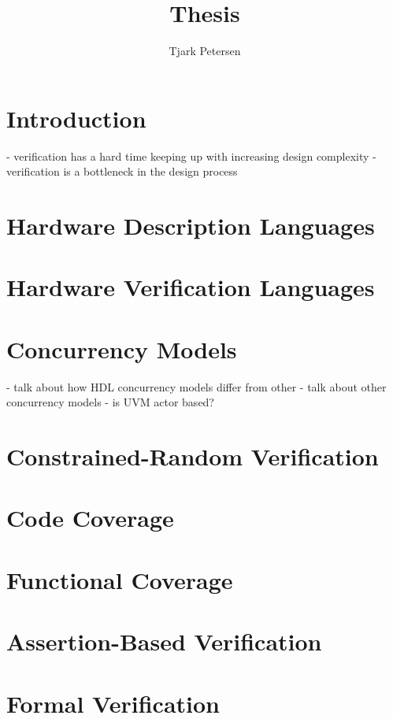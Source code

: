 \documentclass[11pt]{article}
\author{Tjark Petersen}
\title{Thesis}
\begin{document}
\maketitle

\section{Introduction}

- verification has a hard time keeping up with increasing design complexity
- verification is a bottleneck in the design process

\section{Hardware Description Languages}

\section{Hardware Verification Languages}

\section{Concurrency Models}
- talk about how HDL concurrency models differ from other
- talk about other concurrency models
- is UVM actor based?

\section{Constrained-Random Verification}

\section{Code Coverage}

\section{Functional Coverage}

\section{Assertion-Based Verification}

\section{Formal Verification}
\end{document}
